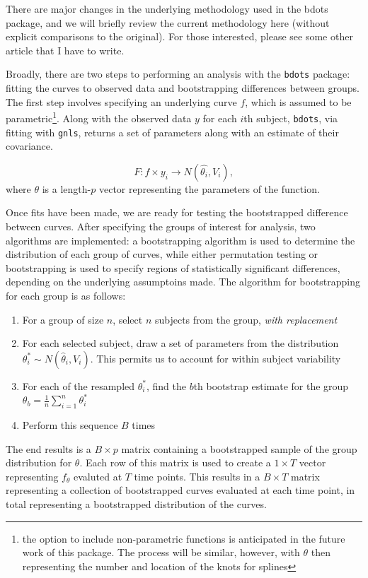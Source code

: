 \documentclass{article}
\newcommand{\xt}{\texttt}%
\begin{document}
There are major changes in the underlying methodology used in the bdots package, and we will briefly review the current methodology here (without explicit comparisons to the original). For those interested, please see some other article that I have to write.

Broadly, there are two steps to performing an analysis with the \xt{bdots} package: fitting the curves to observed data and bootstrapping differences between groups. The first step involves specifying an underlying curve $f$, which is assumed to be parametric\footnote{the option to include non-parametric functions is anticipated in the future work of this package. The process will be similar, however, with $\theta$ then representing the number and location of the knots for splines}. Along with the observed data $y$ for each $i$th subject, \xt{bdots}, via fitting with \xt{gnls}, returns a set of parameters along with an estimate of their covariance.

\begin{equation}
F: f \times y_i \rightarrow N(\hat{\theta_i}, V_{i}),
\end{equation}
where $\theta$ is a length-$p$ vector representing the parameters of the function.


Once fits have been made, we are ready for testing the bootstrapped difference between curves. After specifying the groups of interest for analysis, two algorithms are implemented: a bootstrapping algorithm is used to determine the distribution of each group of curves, while either permutation testing or bootstrapping is used to specify regions of statistically significant differences, depending on the underlying assumptoins made. The algorithm for  bootstrapping for each group is as follows:

\begin{enumerate}
\item For a group of size $n$, select $n$ subjects from the group, \textit{with replacement}
\item For each selected subject, draw a set of parameters from the distribution $\theta_{i}^* \sim N(\hat{\theta}_i, V_i)$. This permits us to account for within subject variability
\item For each of the resampled $\theta_i^*$, find the $b$th bootstrap estimate for the group $\theta_b = \frac1n \sum_{i=1}^n \theta_i^*$
\item Perform this sequence $B$ times
\end{enumerate}


The end results is a $B \times p$ matrix containing a bootstrapped sample of the group distribution for $\theta$. Each row of this matrix is used to create a $1 \times T$ vector representing $f_{\theta}$ evaluted at $T$ time points. This results in a $B \times T$ matrix representing a collection of bootstrapped curves evaluated at each time point, in total representing a bootstrapped distribution of the curves.
\end{document}
